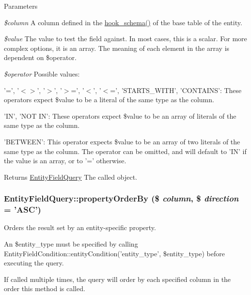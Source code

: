 \begin{DoxyParams}{Parameters}
\item[{\em \$column}]A column defined in the \hyperlink{group__schemaapi_ga9abd926ddaf68a22e6dca28a25d0c6f5}{hook\_\-schema()} of the base table of the entity. \item[{\em \$value}]The value to test the field against. In most cases, this is a scalar. For more complex options, it is an array. The meaning of each element in the array is dependent on \$operator. \item[{\em \$operator}]Possible values:
\begin{DoxyItemize}
\item '=', '$<$$>$', '$>$', '$>$=', '$<$', '$<$=', 'STARTS\_\-WITH', 'CONTAINS': These operators expect \$value to be a literal of the same type as the column.
\item 'IN', 'NOT IN': These operators expect \$value to be an array of literals of the same type as the column.
\item 'BETWEEN': This operator expects \$value to be an array of two literals of the same type as the column. The operator can be omitted, and will default to 'IN' if the value is an array, or to '=' otherwise.
\end{DoxyItemize}\end{DoxyParams}
\begin{DoxyReturn}{Returns}
\hyperlink{classEntityFieldQuery}{EntityFieldQuery} The called object. 
\end{DoxyReturn}
\hypertarget{classEntityFieldQuery_af53f3f1b5da41238638389da6e153dbe}{
\subsubsection[{propertyOrderBy}]{\setlength{\rightskip}{0pt plus 5cm}EntityFieldQuery::propertyOrderBy (\$ {\em column}, \/  \$ {\em direction} = {\ttfamily 'ASC'})}}
\label{classEntityFieldQuery_af53f3f1b5da41238638389da6e153dbe}
Orders the result set by an entity-\/specific property.

An \$entity\_\-type must be specified by calling EntityFieldCondition::entityCondition('entity\_\-type', \$entity\_\-type) before executing the query.

If called multiple times, the query will order by each specified column in the order this method is called.


